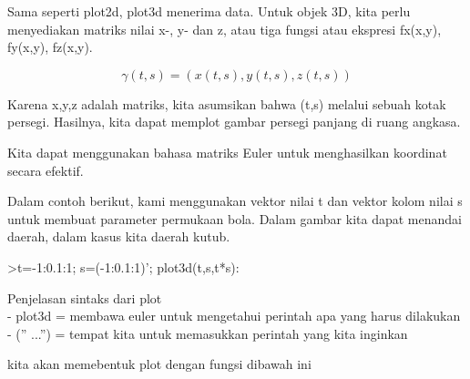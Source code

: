\documentclass[a4paper,10pt]{article}
\begin{document}
\begin{eulernotebook}
\begin{eulercomment}
Sama seperti plot2d, plot3d menerima data. Untuk objek 3D, kita perlu
menyediakan matriks nilai x-, y- dan z, atau tiga fungsi atau ekspresi
fx(x,y), fy(x,y), fz(x,y).

\end{eulercomment}
\begin{eulerformula}
\[
\gamma(t,s) = (x(t,s),y(t,s),z(t,s))
\]
\end{eulerformula}
\begin{eulercomment}
Karena x,y,z adalah matriks, kita asumsikan bahwa (t,s) melalui sebuah
kotak persegi. Hasilnya, kita dapat memplot gambar persegi panjang di
ruang angkasa.

Kita dapat menggunakan bahasa matriks Euler untuk menghasilkan
koordinat secara efektif.

Dalam contoh berikut, kami menggunakan vektor nilai t dan vektor kolom
nilai s untuk membuat parameter permukaan bola. Dalam gambar kita
dapat menandai daerah, dalam kasus kita daerah kutub.

\end{eulercomment}
\begin{eulerprompt}
>t=-1:0.1:1; s=(-1:0.1:1)'; plot3d(t,s,t*s):
\end{eulerprompt}
\begin{eulercomment}
Penjelasan sintaks dari plot\\
- plot3d = membawa euler untuk mengetahui perintah apa yang harus
dilakukan\\
- (” ...”) = tempat kita untuk memasukkan perintah yang kita inginkan

\end{eulercomment}
\begin{eulercomment}
kita akan memebentuk plot dengan fungsi dibawah ini


\end{eulercomment}
\end{eulernotebook}
\end{document}
